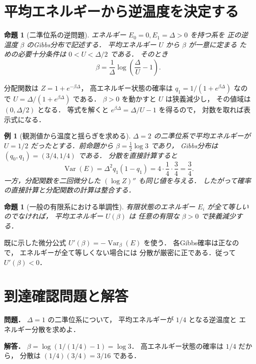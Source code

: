 \documentclass[a5paper,10pt,onecolumn]{jsarticle}
\makeatletter
\theoremstyle{mathnotetheorem}
\newtheorem{proposition}[theorem]{命題}
\newtheorem{example}[theorem]{例}
\renewcommand{\proofname}{証明}
\renewenvironment{proof}[1][\proofname]{%
  \par\pushQED{\qed}\normalfont\topsep4\p@\@plus2\p@\relax
  \trivlist\item[\hskip\labelsep\bfseries #1]\ignorespaces
}{\popQED\endtrivlist\@endpefalse}
\makeatother
\begin{document}
\section{平均エネルギーから逆温度を決定する}
\begin{proposition}[二準位系の逆問題]
エネルギー $E_0=0,E_1=\Delta>0$ を持つ系を
正の逆温度 $\beta$ のGibbs分布で記述する．
平均エネルギー $U$ から $\beta$ が一意に定まる
ための必要十分条件は $0<U<\Delta/2$ である．
そのとき
\[
 \beta=\frac1\Delta\log\left(\frac\Delta U-1\right).
\]
\end{proposition}
\begin{proof}
分配関数は $Z=1+e^{-\beta\Delta}$，
高エネルギー状態の確率は
$q_1=1/(1+e^{\beta\Delta})$ なので
$U=\Delta/(1+e^{\beta\Delta})$ である．
$\beta>0$ を動かすと $U$ は狭義減少し，
その値域は $(0,\Delta/2)$ となる．
等式を解くと
$e^{\beta\Delta}=\Delta/U-1$ を得るので，
対数を取れば表示式になる．
\end{proof}
\begin{example}[観測値から温度と揺らぎを求める]
$\Delta=2$ の二準位系で平均エネルギーが
$U=1/2$ だったとする．前命題から
$\beta=\frac12\log3$ であり，
Gibbs分布は $(q_0,q_1)=(3/4,1/4)$ である．
分散を直接計算すると
\[
 \operatorname{Var}(E)
 =\Delta^2q_1(1-q_1)
 =4\cdot\frac14\cdot\frac34=\frac34.
\]
一方，分配関数を二回微分した
$(\log Z)''$ も同じ値を与える．
したがって確率の直接計算と分配関数の計算は整合する．
\end{example}
\begin{proposition}[一般の有限系における単調性]
有限状態のエネルギー $E_i$ が全て等しいのでなければ，
平均エネルギー $U(\beta)$ は
任意の有限な $\beta>0$ で狭義減少する．
\end{proposition}
\begin{proof}
既に示した微分公式
$U'(\beta)=-\operatorname{Var}_\beta(E)$ を使う．
各Gibbs確率は正なので，
エネルギーが全て等しくない場合には
分散が厳密に正である．従って $U'(\beta)<0$．
\end{proof}
\section*{到達確認問題と解答}
\noindent\textbf{問題．}
$\Delta=1$ の二準位系について，
平均エネルギーが $1/4$ となる逆温度と
エネルギー分散を求めよ．

\medskip\noindent\textbf{解答．}
$\beta=\log(1/(1/4)-1)=\log3$．
高エネルギー状態の確率は $1/4$ だから，
分散は $(1/4)(3/4)=3/16$ である．
\end{document}
